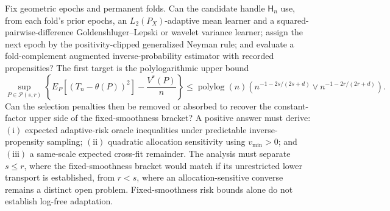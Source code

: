 Fix geometric epochs and permanent folds.  Can the candidate handle \(\mathsf H_n\) use, from each fold's prior epochs, an \(L_2(P_X)\)-adaptive mean learner and a squared-pairwise-difference Goldenshluger--Lepski or wavelet variance learner; assign the next epoch by the positivity-clipped generalized Neyman rule; and evaluate a fold-complement augmented inverse-probability estimator with recorded propensities?  The first target is the polylogarithmic upper bound
\[
\sup_{P\in\mathcal P(s,r)}
\left\{E_P[(T_n-\theta(P))^2]-\frac{V^*(P)}n\right\}
\leq \operatorname{polylog}(n)
\left(n^{-1-2s/(2s+d)}\vee n^{-1-2r/(2r+d)}\right).
\]
Can the selection penalties then be removed or absorbed to recover the constant-factor upper side of the fixed-smoothness bracket?  A positive answer must derive: \(\mathrm{(i)}\) expected adaptive-risk oracle inequalities under predictable inverse-propensity sampling; \(\mathrm{(ii)}\) quadratic allocation sensitivity using \(v_{\min}>0\); and \(\mathrm{(iii)}\) a same-scale expected cross-fit remainder.  The analysis must separate \(s\leq r\), where the fixed-smoothness bracket would match if its unrestricted lower transport is established, from \(r<s\), where an allocation-sensitive converse remains a distinct open problem.  Fixed-smoothness risk bounds alone do not establish log-free adaptation.